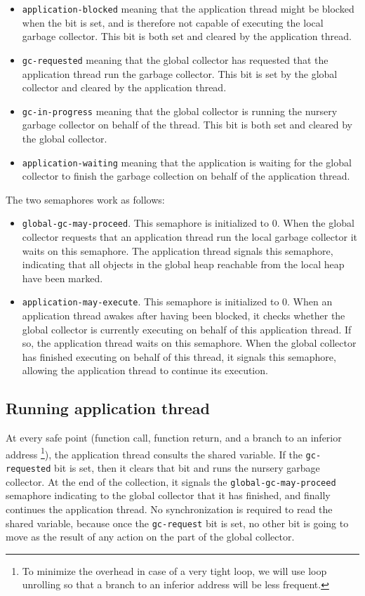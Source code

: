 \begin{itemize}
\item \texttt{application-blocked} meaning that the application thread
  might be blocked when the bit is set, and is therefore not capable
  of executing the local garbage collector.  This bit is both set and
  cleared by the application thread.
\item \texttt{gc-requested} meaning that the global collector has
  requested that the application thread run the garbage collector.
  This bit is set by the global collector and cleared by the
  application thread.
\item \texttt{gc-in-progress} meaning that the global collector is
  running the nursery garbage collector on behalf of the thread.  This
  bit is both set and cleared by the global collector.
\item \texttt{application-waiting} meaning that the application is
  waiting for the global collector to finish the garbage collection on
  behalf of the application thread.
\end{itemize}

The two semaphores work as follows:

\begin{itemize}
\item \texttt{global-gc-may-proceed}.  This semaphore is initialized to
  $0$.  When the global collector requests that an application thread
  run the local garbage collector it waits on this semaphore.  The
  application thread signals this semaphore, indicating that all
  objects in the global heap reachable from the local heap have been
  marked.
\item \texttt{application-may-execute}.  This semaphore is initialized
  to $0$.  When an application thread awakes after having been
  blocked, it checks whether the global collector is currently
  executing on behalf of this application thread.  If so, the
  application thread waits on this semaphore.  When the global
  collector has finished executing on behalf of this thread, it
  signals this semaphore, allowing the application thread to continue
  its execution.
\end{itemize}

\subsection{Running application thread}

At every safe point (function call, function return, and a branch to
an inferior address%
\footnote{To minimize the overhead in case of a very tight loop, we
  will use loop unrolling so that a branch to an inferior address will
  be less frequent.}), the application thread consults the shared
variable.  If the \texttt{gc-requested} bit is set, then it clears
that bit and runs the nursery garbage collector.  At the end of the
collection, it signals the \texttt{global-gc-may-proceed} semaphore
indicating to the global collector that it has finished, and finally
continues the application thread.  No synchronization is required to
read the shared variable, because once the \texttt{gc-request} bit is
set, no other bit is going to move as the result of any action on the
part of the global collector.

